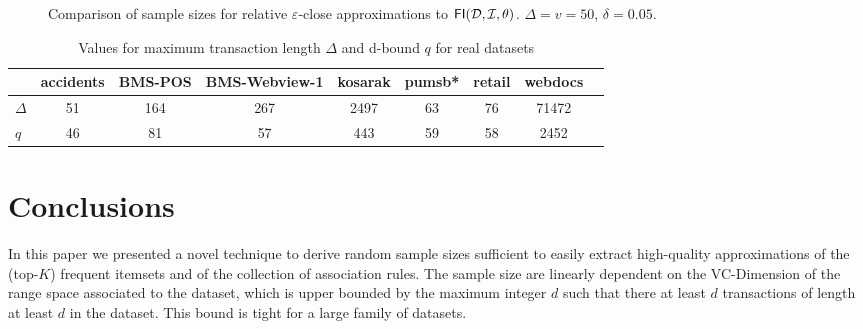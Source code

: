 \begin{figure}[tp]
  \centering
  \hfill
  \caption{Comparison of sample sizes for relative $\varepsilon$-close approximations to
  $\mathsf{FI}({\cal D},{\cal I},\theta)$. $\Delta=v=50$, $\delta=0.05$.}
  \label{fig:compareSamSize}
\end{figure}

\begin{table}[hbt]
\centering
\caption{Values for maximum transaction length $\Delta$ and d-bound $q$ for real datasets}
\label{tab:deltadrealds}

\begin{tabular}{lcccccccc}
  \toprule
  & accidents & BMS-POS & BMS-Webview-1 & kosarak & pumsb* & retail & webdocs \\
  \midrule
  $\Delta$ & 51 & 164 & 267 & 2497 & 63 & 76 & 71472 \\
  $q$ & 46 & 81 & 57 & 443 & 59 & 58 & 2452 \\ 
  \bottomrule
\end{tabular}
\end{table}

\section{Conclusions}\label{sec:vcmineconcl}
In this paper we presented a novel technique to derive random sample sizes
sufficient to easily extract high-quality approximations of the (top-$K$)
frequent itemsets and of the collection of association rules. The sample size
are linearly dependent on the VC-Dimension of the range space associated to the
dataset, which is upper bounded by the maximum integer $d$ such
that there at least $d$ transactions of length at least $d$ in the dataset. This 
bound is tight for a large family of datasets.  

